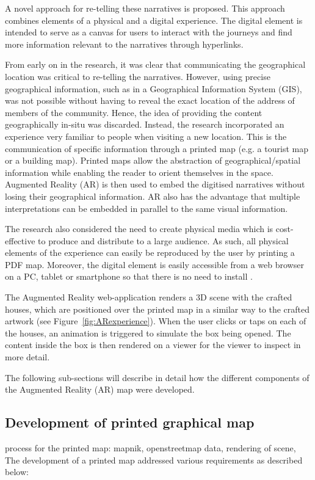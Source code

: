 \documentclass{egpubl}
\begin{document}
A novel approach for re-telling these narratives is proposed. This approach
combines elements of a physical and a digital experience. The digital element
is intended to serve as a canvas for users to interact with the journeys and
find more information relevant to the narratives through hyperlinks. 

From early on in the research, it was clear that communicating the
geographical location was critical to re-telling the narratives. However,
using precise geographical information, such as in a Geographical Information
System (GIS), was not possible without having to reveal the exact location of
the address of members of the community. Hence, the idea of providing the
content geographically in-situ was discarded. Instead, the research
incorporated an experience very familiar to people when visiting a new
location. This is the communication of specific information through a printed
map (e.g. a tourist map or a building map). Printed maps allow the
abstraction of geographical/spatial information while enabling the reader to
orient themselves in the space. Augmented Reality (AR) is then used to embed
the digitised narratives without losing their geographical information. AR
also has the advantage that multiple interpretations can be embedded in
parallel to the same visual information. 

The research also considered the need to create physical media which is
cost-effective to produce and distribute to a large audience. As such, all
physical elements of the experience can easily be reproduced by the user by
printing a PDF map. Moreover, the digital element is easily accessible from a
web browser on a PC, tablet or smartphone so that there is no need to install
. 

The Augmented Reality web-application renders a 3D scene with the crafted
houses, which are positioned over the printed map in a similar way to the
crafted artwork (see Figure~\ref{fig:ARexperience}). When the user clicks or
taps on each of the houses, an animation is triggered to simulate the box
being opened. The content inside the box is then rendered on a viewer for the
viewer to inspect in more detail. 

The following sub-sections will describe in detail how the different
components of the Augmented Reality (AR) map were developed.

\subsection{Development of printed graphical map} %
process for the printed map: mapnik, openstreetmap data, rendering of scene, 
The development of a printed map addressed various requirements as described
below:
\end{document}
